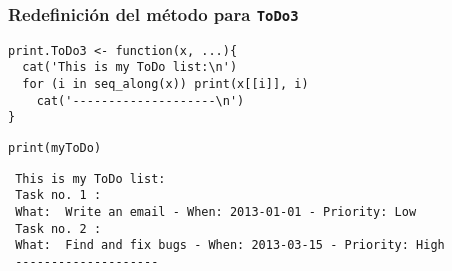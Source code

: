\documentclass[xcolor={usenames,svgnames,dvipsnames}]{beamer}
\begin{document}
\begin{frame}[fragile]
\frametitle{Redefinición del método para \texttt{ToDo3}}
\label{sec-2-2-5}


\lstset{language=R}
\begin{lstlisting}
print.ToDo3 <- function(x, ...){
  cat('This is my ToDo list:\n')
  for (i in seq_along(x)) print(x[[i]], i)
    cat('--------------------\n')
}
\end{lstlisting}



\lstset{language=R}
\begin{lstlisting}
print(myToDo)
\end{lstlisting}

\begin{verbatim}
 This is my ToDo list:
 Task no. 1 :
 What:  Write an email - When: 2013-01-01 - Priority: Low 
 Task no. 2 :
 What:  Find and fix bugs - When: 2013-03-15 - Priority: High 
 --------------------
\end{verbatim}
\end{frame}
\end{document}
